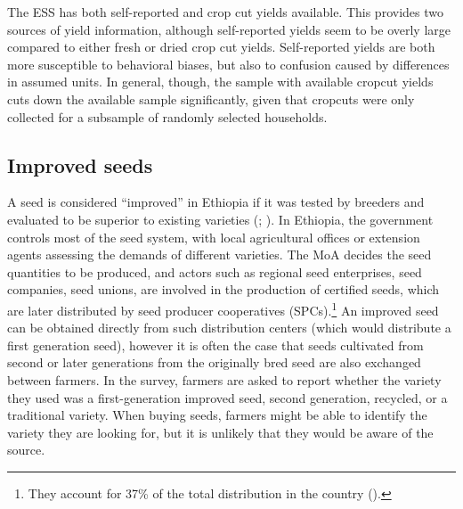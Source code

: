 \documentclass[11pt]{article}
\begin{document}

The ESS has both self-reported and crop cut yields available. This provides two sources of yield information, although self-reported yields seem to be overly large compared to either fresh or dried crop cut yields. Self-reported yields are both more susceptible to behavioral biases, but also to confusion caused by differences in assumed units. In general, though, the sample with available cropcut yields cuts down the available sample significantly, given that cropcuts were only collected for a subsample of randomly selected households.


\subsection{Improved seeds}

A seed is considered “improved” in Ethiopia if it was tested by breeders and evaluated to be superior to existing varieties  (\citep{MoA13}; \citep{kosmowski2020shining}). In Ethiopia, the government controls most of the seed system, with local agricultural offices or extension agents assessing the demands of different varieties. The MoA decides the seed quantities to be produced, and actors such as regional seed enterprises, seed companies, seed unions, are involved in the production of certified seeds, which are later distributed by seed producer cooperatives (SPCs).\footnote{They account for 37\% of the total distribution in the country (\citep{kosmowski2020shining}).} An improved seed can be obtained directly from such distribution centers (which would distribute a first generation seed), however it is often the case that seeds cultivated from second or later generations from the originally bred seed are also exchanged between farmers. In the survey, farmers are asked to report whether the variety they used was a first-generation improved seed, second generation, recycled, or a traditional variety. When buying seeds, farmers might be able to identify the variety they are looking for, but it is unlikely that they would be aware of the source. 
\end{document}
